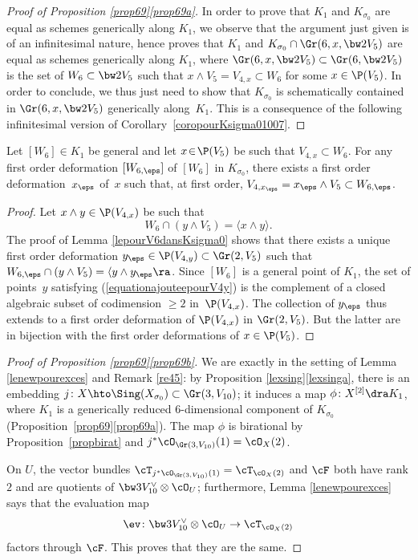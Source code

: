 \begin{proof}[Proof of Proposition \ref{prop69}\eqref{prop69a}]
In order to prove that $K_1$ and $K_{\sigma_0}$ are equal as schemes generically along $K_1$, we observe that the argument just given is of an
infinitesimal nature, hence proves that $K_1$ and
$K_{\sigma_0}\cap \Gr(6,x,\bw2V_5)$ are equal as schemes generically along $K_1$, where $\Gr(6,x,\bw2V_5)\subset \Gr(6,\bw2V_5)$ is the set of $W_6\subset \bw2V_5$ such that
$x\wedge V_5=V_{4,x}\subset W_6$ for some $x\in \P(V_5)$.
In order to conclude, we thus just need to show that $K_{\sigma_0}$ is schematically contained in $\Gr(6,x,\bw2V_5)$ generically along~$K_1$. This is a consequence of the following infinitesimal version of Corollary~\ref{coropourKsigma01007}.\end{proof}

\begin{lemm} Let $[W_6]\!\in\!K_1$ be general and let $x\!\in\!\P(V_5)$ be such that
$V_{4,x}\!\subset\!W_6$. For any first order deformation $[W_{6,\eps}]$ of $[W_6]$ in $K_{\sigma_0}$, there exists a first order deforma\-tion~$x_\eps$ of~$x$ such that,
at first order, $V_{4,x_\eps}=x_\eps \wedge V_5\subset W_{6,\eps}$.
\end{lemm}

\begin{proof} Let $x\wedge y\in \P(V_{4,x})$ be such that \begin{equation}\label{equationajouteepourV4y}
W_6\cap (y\wedge V_5)=\langle x\wedge y\rangle.
\end{equation}
The proof
of Lemma \ref{lepourV6dansKsigma0} shows that
there exists a unique first order deformation $ y_\eps \in \P(V_{4,y})\subset \Gr(2,V_5)$ such that
$W_{6,\eps}\cap( y\wedge V_5)=\langle y\wedge y_\eps\ra$. Since $[W_6]$ is a general point of $K_1$, the set of points~$y$ satisfying (\ref{equationajouteepourV4y}) is the complement
of a closed algebraic subset of codimension $\geq2$ in~$\P(V_{4,x})$. The collection
of $y_\eps$ thus extends to a first order deformation of $\P(V_{4,x})$ in $\Gr(2,V_5)$.
But the latter are in bijection with the first order deformations of $x\in \P(V_5)$.
\end{proof}

\begin{proof}[Proof of Proposition \ref{prop69}\eqref{prop69b}]

We are exactly in the setting of Lemma \ref{lenewpourexces} and Remark \ref{re45}: by Proposition \ref{lexsing}\eqref{lexsinga}, there is an embedding
$j\colon X\hto \Sing (X_{\sigma_0})\subset \Gr(3,V_{10})$;
it induces a map
$\phi\colon X^{[2]}\dra K_1$,
where $K_1$ is a generically reduced $6$-dimensional component of $K_{\sigma_0}$ (Proposition~\ref{prop69}\eqref{prop69a}). The map $\phi$ is birational by Proposition~\ref{propbirat} and $j^*\cO_{\Gr(3,V_{10})}(1)=\cO_X(2)$.

On $U$, the vector bundles
$\cT_{j^*\cO_{\Gr(3,V_{10})}(1)}=\cT_{\cO_X(2)}$ and $\cF$ both have rank $2$ and are quotients of $\bw3V_{10}^\vee\otimes \cO_U$; furthermore,
Lemma \ref{lenewpourexces} says that the
evaluation map
\[
\ev\colon\bw3V_{10}^\vee\otimes \cO_U\to \cT_{\cO_X(2)}
\]
factors through $\cF$. This proves that they are the same.
\end{proof}

